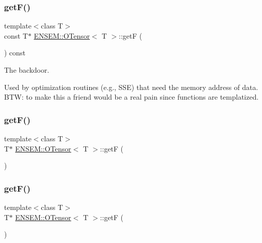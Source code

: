 \subsubsection{\texorpdfstring{getF()}{getF()}\hspace{0.1cm}{\footnotesize\ttfamily [3/6]}}
{\footnotesize\ttfamily template$<$class T$>$ \\
const T$\ast$ \mbox{\hyperlink{classENSEM_1_1OTensor}{E\+N\+S\+E\+M\+::\+O\+Tensor}}$<$ T $>$\+::getF (\begin{DoxyParamCaption}{ }\end{DoxyParamCaption}) const\hspace{0.3cm}{\ttfamily [inline]}}



The backdoor. 

Used by optimization routines (e.\+g., S\+SE) that need the memory address of data. B\+TW\+: to make this a friend would be a real pain since functions are templatized. \mbox{\label{classENSEM_1_1OTensor_acaf63577c9d67fe58f649ae9fac008c1}} 
\subsubsection{\texorpdfstring{getF()}{getF()}\hspace{0.1cm}{\footnotesize\ttfamily [4/6]}}
{\footnotesize\ttfamily template$<$class T$>$ \\
T$\ast$ \mbox{\hyperlink{classENSEM_1_1OTensor}{E\+N\+S\+E\+M\+::\+O\+Tensor}}$<$ T $>$\+::getF (\begin{DoxyParamCaption}{ }\end{DoxyParamCaption})\hspace{0.3cm}{\ttfamily [inline]}}

\mbox{\label{classENSEM_1_1OTensor_acaf63577c9d67fe58f649ae9fac008c1}} 
\subsubsection{\texorpdfstring{getF()}{getF()}\hspace{0.1cm}{\footnotesize\ttfamily [5/6]}}
{\footnotesize\ttfamily template$<$class T$>$ \\
T$\ast$ \mbox{\hyperlink{classENSEM_1_1OTensor}{E\+N\+S\+E\+M\+::\+O\+Tensor}}$<$ T $>$\+::getF (\begin{DoxyParamCaption}{ }\end{DoxyParamCaption})\hspace{0.3cm}{\ttfamily [inline]}}

